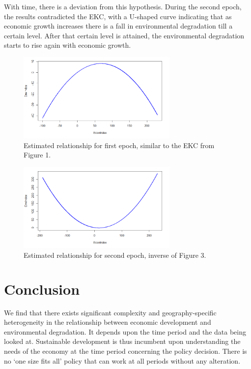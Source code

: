 \documentclass{article}
\begin{document}
With time, there is a deviation from this hypothesis. During the second epoch, the results contradicted the EKC, with a U-shaped curve indicating that as economic growth increases there is a fall in environmental degradation till a certain level. After that certain level is attained, the environmental degradation starts to rise again with economic growth.

\begin{figure}[h]
    \centering
    \includegraphics[width=0.7\textwidth]{images/kuznets.png}
    \caption{Estimated relationship for first epoch, similar to the EKC from Figure 1.}
\end{figure}

\begin{figure}[h]
    \centering
    \includegraphics[width=0.7\textwidth]{images/notkuznets.png}
    \caption{Estimated relationship for second epoch, inverse of Figure 3.}
\end{figure}


\section{Conclusion}

We find that there exists significant complexity and geography-specific heterogeneity in the relationship between economic development and environmental degradation. It depends upon the time period and the data being looked at. Sustainable development is thus incumbent upon understanding the needs of the economy at the time period concerning the policy decision. There is no ‘one size fits all’ policy that can work at all periods without any alteration.
\end{document}
